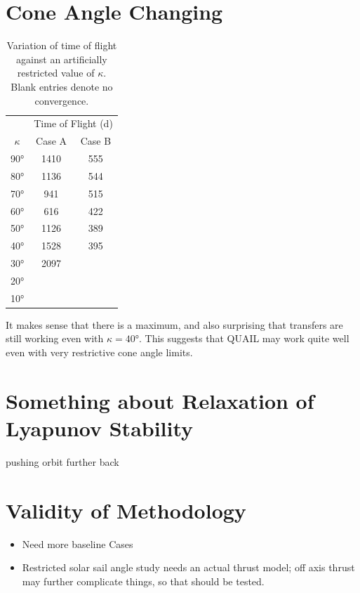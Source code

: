 \section{Cone Angle Changing}
\begin{table}[H]
    \centering
    \begin{tabular}{ccc}
        \toprule
                   & \multicolumn{2}{c}{Time of Flight (d)}          \\
        \(\kappa\) & Case A                                 & Case B \\
        \midrule
        \ang{90}   & 1410                                   & 555    \\
        \ang{80}   & 1136                                   & 544    \\
        \ang{70}   & 941                                    & 515    \\
        \ang{60}   & 616                                    & 422    \\
        \ang{50}   & 1126                                   & 389    \\
        \ang{40}   & 1528                                   & 395    \\
        \ang{30}   & 2097                                   &        \\
        \ang{20}   &                                        &        \\
        \ang{10}   &                                        &        \\
        \bottomrule
    \end{tabular}
    \caption{Variation of time of flight against an artificially restricted value of \(\kappa\). Blank entries denote no convergence.}
    \label{tab:cone_angle_changing}
\end{table}

It makes sense that there is a maximum, and also surprising that transfers are still working even with \(\kappa = \ang{40}\). This suggests that QUAIL may work quite well even with very restrictive cone angle limits.


\section{Something about Relaxation of Lyapunov Stability}

pushing orbit further back

\section{Validity of Methodology}

\begin{itemize}
    \item Need more baseline Cases
    \item Restricted solar sail angle study needs an actual thrust model; off axis thrust may further complicate things, so that should be tested.
\end{itemize}